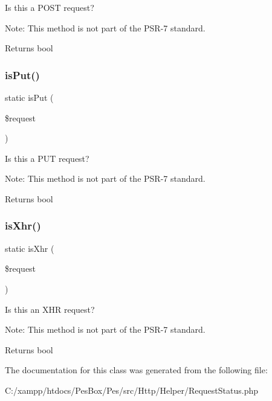 Is this a P\+O\+ST request?

Note\+: This method is not part of the P\+S\+R-\/7 standard.

\begin{DoxyReturn}{Returns}
bool 
\end{DoxyReturn}
\mbox{\label{class_pes_1_1_http_1_1_helper_1_1_request_status_a7dbb2379506025c65456ab0dfede8e7e}} 
\subsubsection{\texorpdfstring{is\+Put()}{isPut()}}
{\footnotesize\ttfamily static is\+Put (\begin{DoxyParamCaption}\item[{Server\+Request\+Interface}]{\$request }\end{DoxyParamCaption})\hspace{0.3cm}{\ttfamily [static]}}

Is this a P\+UT request?

Note\+: This method is not part of the P\+S\+R-\/7 standard.

\begin{DoxyReturn}{Returns}
bool 
\end{DoxyReturn}
\mbox{\label{class_pes_1_1_http_1_1_helper_1_1_request_status_aa5daa7897af9e297f5b0a0ee30dd75bb}} 
\subsubsection{\texorpdfstring{is\+Xhr()}{isXhr()}}
{\footnotesize\ttfamily static is\+Xhr (\begin{DoxyParamCaption}\item[{Server\+Request\+Interface}]{\$request }\end{DoxyParamCaption})\hspace{0.3cm}{\ttfamily [static]}}

Is this an X\+HR request?

Note\+: This method is not part of the P\+S\+R-\/7 standard.

\begin{DoxyReturn}{Returns}
bool 
\end{DoxyReturn}


The documentation for this class was generated from the following file\+:\begin{DoxyCompactItemize}
\item 
C\+:/xampp/htdocs/\+Pes\+Box/\+Pes/src/\+Http/\+Helper/Request\+Status.\+php\end{DoxyCompactItemize}
